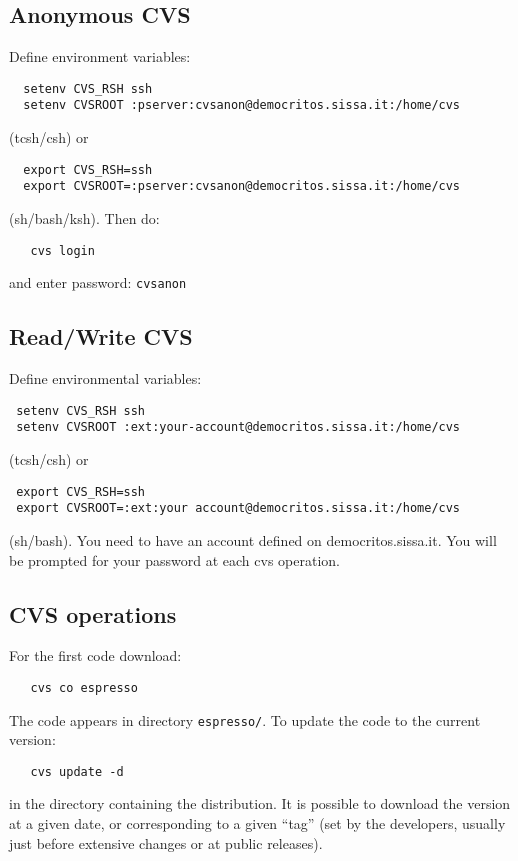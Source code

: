 \documentclass[12pt,a4paper]{article}
\begin{document}
\subsection{Anonymous CVS}

Define environment variables:
\begin{verbatim}
  setenv CVS_RSH ssh
  setenv CVSROOT :pserver:cvsanon@democritos.sissa.it:/home/cvs
\end{verbatim}
(tcsh/csh) or
\begin{verbatim}
  export CVS_RSH=ssh
  export CVSROOT=:pserver:cvsanon@democritos.sissa.it:/home/cvs
\end{verbatim}
(sh/bash/ksh). Then do:
\begin{verbatim}
   cvs login
\end{verbatim}
and enter password: \texttt{cvsanon}

\subsection{Read/Write CVS}

Define environmental variables:
\begin{verbatim}
 setenv CVS_RSH ssh
 setenv CVSROOT :ext:your-account@democritos.sissa.it:/home/cvs
\end{verbatim}
(tcsh/csh) or
\begin{verbatim}
 export CVS_RSH=ssh
 export CVSROOT=:ext:your account@democritos.sissa.it:/home/cvs
\end{verbatim}
(sh/bash). You need to have an account defined on democritos.sissa.it.
You will be prompted for your password at each cvs operation.

\subsection{CVS operations}

For the first code download:
\begin{verbatim}
   cvs co espresso
\end{verbatim}
The code appears in directory \texttt{espresso/}.
To update the code to the current version:
\begin{verbatim}
   cvs update -d
\end{verbatim}
in the directory containing the distribution. It is possible 
to download the version at a given date, or corresponding to 
a given ``tag'' (set by the developers, usually just before 
extensive changes or at public releases).
\end{document}
